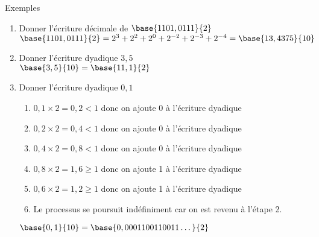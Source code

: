 \documentclass[10pt]{beamer}
\begin{document}
\begin{frame}{\Ctitle}{\stitle}
	\begin{exampleblock}{Exemples}
		\begin{enumerate}
			\item<1-> Donner l'écriture décimale de $\base{1101,0111}{2}$ \\
				\onslide<2-> \textcolor{OliveGreen}{$\base{1101,0111}{2} = 2^3+2^2+2^0+2^{-2}+2^{-3}+2^{-4} = \base{13,4375}{10}$}
			\item<3-> Donner l'écriture dyadique $3,5$\\
				\onslide<4-> \textcolor{OliveGreen}{$\base{3,5}{10}=\base{11,1}{2}$}
            \item<5-> Donner l'écriture dyadique $0,1$
				\onslide<6->
                    \begin{enumerate}
                    \item<7-> \textcolor{OliveGreen}{$0,1 \times 2 = 0,2 < 1$ donc on ajoute 0 à l'écriture dyadique }
                    \item<8-> \textcolor{OliveGreen}{$0,2 \times 2 = 0,4 < 1$ donc on ajoute 0 à l'écriture dyadique}
                    \item<9-> \textcolor{OliveGreen}{$0,4 \times 2 = 0,8 < 1$ donc on ajoute 0 à l'écriture dyadique}
                    \item<10->\textcolor{OliveGreen}{$0,8 \times 2 = 1,6 \geq 1$ donc on ajoute 1 à l'écriture dyadique}
                    \item<11->\textcolor{OliveGreen}{$0,6 \times 2 = 1,2 \geq 1$  donc on ajoute 1 à l'écriture dyadique}
                    \item<12->\textcolor{OliveGreen}{Le processus se poursuit indéfiniment car on est revenu à l'étape 2.}
                    \end{enumerate}
                \textcolor{OliveGreen}{$\base{0,1}{10} = \base{0,0001100110011\dots}{2}$}   
		\end{enumerate}

	\end{exampleblock}
\end{frame}
\end{document}

